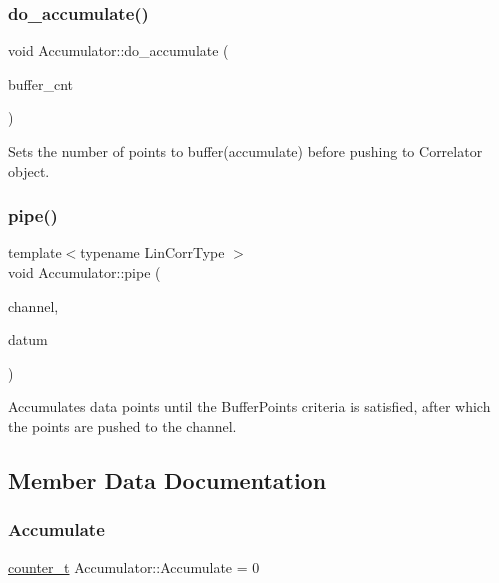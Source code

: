 \subsubsection{\texorpdfstring{do\+\_\+accumulate()}{do\_accumulate()}}
{\footnotesize\ttfamily void Accumulator\+::do\+\_\+accumulate (\begin{DoxyParamCaption}\item[{unsigned int}]{buffer\+\_\+cnt }\end{DoxyParamCaption})\hspace{0.3cm}{\ttfamily [inline]}}



Sets the number of points to buffer(accumulate) before pushing to Correlator object. 

\mbox{\label{classAccumulator_aa7494b569b7f4f2d2ab115e623ab135d}} 
\subsubsection{\texorpdfstring{pipe()}{pipe()}}
{\footnotesize\ttfamily template$<$typename Lin\+Corr\+Type $>$ \\
void Accumulator\+::pipe (\begin{DoxyParamCaption}\item[{Lin\+Corr\+Type \&}]{channel,  }\item[{const \hyperlink{types_8hpp_a22f279793847eba127de149437848c48}{counter\+\_\+t}}]{datum }\end{DoxyParamCaption})\hspace{0.3cm}{\ttfamily [inline]}}



Accumulates data points until the Buffer\+Points criteria is satisfied, after which the points are pushed to the channel. 



\subsection{Member Data Documentation}
\mbox{\label{classAccumulator_a8e615af8b85dd2c8500d1f8c473879ab}} 
\subsubsection{\texorpdfstring{Accumulate}{Accumulate}}
{\footnotesize\ttfamily \hyperlink{types_8hpp_a22f279793847eba127de149437848c48}{counter\+\_\+t} Accumulator\+::\+Accumulate = 0\hspace{0.3cm}{\ttfamily [private]}}



